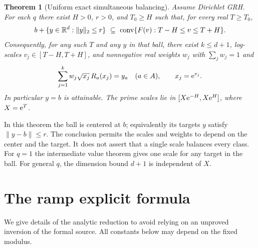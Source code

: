 \documentclass[11pt]{article}
\newtheorem{theorem}{Theorem}[section]
\theoremstyle{remark}\newtheorem{remark}[theorem]{Remark}
\newcommand{\R}{\mathbb R}\newcommand{\C}{\mathbb C}\newcommand{\Z}{\mathbb Z}
\begin{document}
\begin{theorem}[Uniform exact simultaneous balancing]\label{thm:balance}
Assume Dirichlet GRH. For each $q$ there exist $H>0$, $r>0$, and $T_0\ge H$ such that, for every real $T\ge T_0$,
\[
 b+\{y\in\R^d:\|y\|_2\le r\}\ \subseteq\
 \conv\{F(v):T-H\le v\le T+H\}.
\]
Consequently, for any such $T$ and any $y$ in that ball, there exist $k\le d+1$, log-scales $v_j\in[T-H,T+H]$, and nonnegative real weights $w_j$ with $\sum_jw_j=1$ and
\[
 \sum_{j=1}^k w_j\sqrt{x_j}\,R_a(x_j)=y_a\quad(a\in A),\qquad x_j=\mathrm e^{v_j}.
\]
In particular $y=b$ is attainable. The prime scales lie in $[X\mathrm e^{-H},X\mathrm e^H]$, where $X=\mathrm e^T$.
\end{theorem}
In this theorem the ball is centered at $b$; equivalently its targets $y$ satisfy $\|y-b\|\le r$. The conclusion permits the scales and weights to depend on the center and the target. It does not assert that a single scale balances every class. For $q=1$ the intermediate value theorem gives one scale for any target in the ball. For general $q$, the dimension bound $d+1$ is independent of $X$.

\section{The ramp explicit formula}
We give details of the analytic reduction to avoid relying on an unproved inversion of the formal source. All constants below may depend on the fixed modulus.
\end{document}
